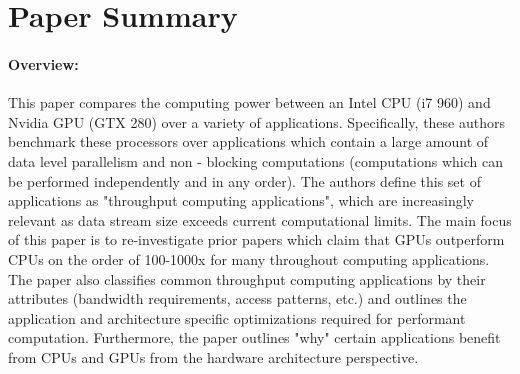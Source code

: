 \documentclass[letterpaper,twocolumn,10pt]{article}
\begin{document}
\noindent {}

\section*{Paper Summary}
\paragraph{\bf Overview:}
This paper compares the computing power between an Intel CPU (i7
960) and Nvidia GPU (GTX 280) over a variety of applications. Specifically,
these authors benchmark these processors over applications which contain a large amount of
data level parallelism and non - blocking computations (computations which
can be performed independently and in any order). The authors define this set of
applications as "throughput computing applications", which are increasingly
relevant as data stream size exceeds current computational limits.\newline
The main focus of this paper is to re-investigate prior papers which claim
that GPUs outperform CPUs on the order of 100-1000x for many throughout computing
applications. The paper also classifies common throughput computing
applications by their attributes (bandwidth requirements, access patterns, etc.) and outlines the
application and architecture specific optimizations required for performant
computation. Furthermore, the paper outlines "why" certain applications benefit from CPUs
and GPUs from the hardware architecture perspective.
\end{document}
